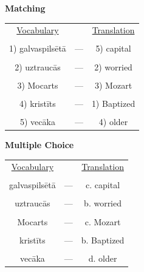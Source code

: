 \documentclass[a4paper]{article}
\begin{document}
\vspace{5mm}

\Large \textbf{Matching} \\
\begin{table}[!th]
\begin{tabularx}{\textwidth}{c c c}
\underline{Vocabulary} & & \underline{Translation} \\
& \\
1) galvaspilsētā & --- & 5) capital  \\
& \\
2) uztraucās & --- & 2) worried \\
& \\
3) Mocarts & --- & 3) Mozart \\
& \\
4) kristīts & --- & 1) Baptized\\
& \\
5) vecāka & --- & 4) older \\
\end{tabularx}
\end{table}

\Large \textbf{Multiple Choice} \\

\begin{table}[!th]
\begin{tabularx}{\textwidth}{c c c}
\underline{Vocabulary} & & \underline{Translation} \\

& \\

galvaspilsētā & --- & c. capital \\

& \\

uztraucās & --- & b. worried \\

& \\

Mocarts & --- & c. Mozart \\

& \\

kristīts & --- & b. Baptized\\

& \\

vecāka & --- & d. older\\
\end{tabularx}
\end{table}
\end{document}
